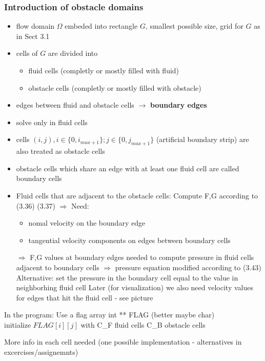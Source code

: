 \subsubsection{Introduction of obstacle domains}
\begin{itemize}
	\item flow domain $\Omega$ embeded into rectangle $G$, smallest possible size, grid for $G$ as in Sect 3.1 %
	\item cells of $G$ are divided into
	\begin{itemize}
		\item fluid cells (completly or mostly filled with fluid)
		\item obstacle cells (completly or mostly filled with obstacle)
	\end{itemize}
	\item edges between fluid and obstacle cells $\rightarrow$ \textbf{boundary edges}
	\item solve only in fluid cells
	\item cells $(i,j), i \in \{0, i_{max+1}\}; j \in \{0,j_{max+1}\}$
	(artificial boundary strip) are also treated as obstacle cells
	\item obstacle cells which share an edge with at least one fluid cell are called boundary cells
	\item Fluid cells that are adjacent to the obstacle cells: Compute F,G according to (3.36) (3.37)%
	$\Rightarrow$ Need: 
	\begin{itemize}
		\item nomal velocity on the boundary edge
		\item tangential velocity components on edges between boundary cells
	\end{itemize}
	\item[$\Rightarrow$] F,G values at boundary edges needed to compute pressure in fluid cells adjacent to boundary cells $\Rightarrow$ pressure equation modified according to (3.43) %
	Alternative: set the pressure in the boundary cell equal to the value in neighborhing fluid cell
	Later (for visualization) we also need velocity values for edges that hit the fluid cell - see picture %
\end{itemize}

In the program: Use a flag array int ** FLAG (better maybe char)\\
initialize $FLAG[i][j]$ with C\_F fluid cells
C\_B obstacle cells

More info in each cell needed (one possible implementation - alternatives in excercises/assignemnts)

